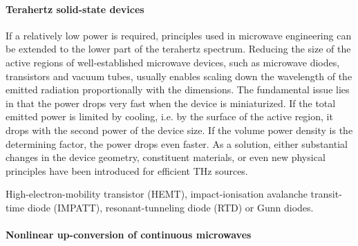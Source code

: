 \paragraph{Terahertz solid-state devices}%
If a relatively low power is required, principles used in microwave engineering can be extended to the lower part of the terahertz spectrum. 
Reducing the size of the active regions of well-established microwave devices, such as microwave diodes, transistors and vacuum tubes, usually enables scaling down the wavelength of the emitted radiation proportionally with the dimensions. 
The fundamental issue lies in that the power drops very fast when the device is miniaturized. If the total emitted power is limited by cooling, i.e. by the surface of the active region, it drops with the second power of the device size. If the volume power density is the determining factor, the power drops even faster. 
As a solution, either substantial changes in the device geometry, constituent materials, or even new physical principles have been introduced for efficient THz sources.  %

High-electron-mobility transistor (HEMT), impact-ionisation avalanche transit-time diode (IMPATT), resonant-tunneling diode (RTD)
\cite{brown1991oscillations}
 or Gunn diodes.


\paragraph{Nonlinear up-conversion of continuous microwaves}%

